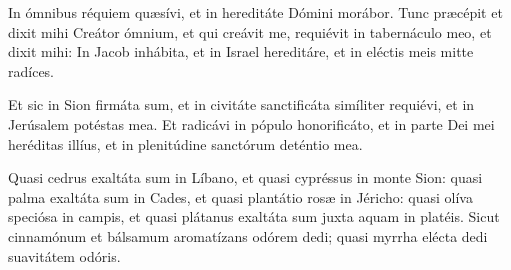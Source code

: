 In ómnibus réquiem quæsívi, et in hereditáte Dómini morábor.
Tunc præcépit et dixit mihi Creátor ómnium, 
et qui creávit me, requiévit in tabernáculo meo,
et dixit mihi: 
In Jacob inhábita, et in Israel hereditáre,
et in eléctis meis mitte radíces.

\tuAutem


\vfill \pagebreak






Et sic in Sion firmáta sum, et in civitáte sanctificáta simíliter requiévi,
et in Jerúsalem potéstas mea.
Et radicávi in pópulo honorificáto, et in parte Dei mei heréditas illíus,
et in plenitúdine sanctórum deténtio mea.

\tuAutem



\vfill \pagebreak






Quasi cedrus exaltáta sum in Líbano, et quasi cypréssus in monte Sion:
quasi palma exaltáta sum in Cades, et quasi plantátio rosæ in Jéricho:
quasi olíva speciósa in campis, et quasi plátanus exaltáta sum juxta aquam
in platéis.
Sicut cinnamónum et bálsamum aromatízans odórem dedi; 
quasi myrrha elécta dedi suavitátem odóris.

\tuAutem


